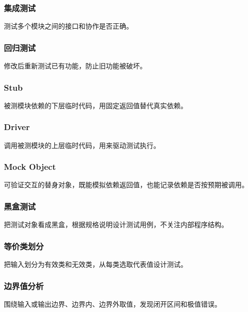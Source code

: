 \documentclass[UTF8,zihao=-4]{ctexart}
\begin{document}
\subsubsection*{集成测试}


测试多个模块之间的接口和协作是否正确。


\subsubsection*{回归测试}


修改后重新测试已有功能，防止旧功能被破坏。


\subsubsection*{Stub}


被测模块依赖的下层临时代码，用固定返回值替代真实依赖。


\subsubsection*{Driver}


调用被测模块的上层临时代码，用来驱动测试执行。


\subsubsection*{Mock Object}


可验证交互的替身对象，既能模拟依赖返回值，也能记录依赖是否按预期被调用。


\subsubsection*{黑盒测试}


把测试对象看成黑盒，根据规格说明设计测试用例，不关注内部程序结构。


\subsubsection*{等价类划分}


把输入划分为有效类和无效类，从每类选取代表值设计测试。


\subsubsection*{边界值分析}


围绕输入或输出边界、边界内、边界外取值，发现闭开区间和极值错误。
\end{document}

